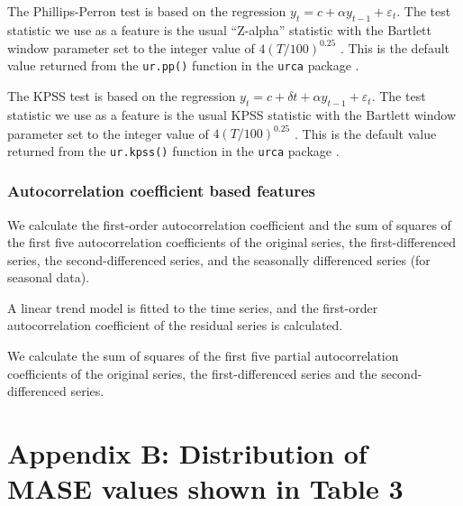 \documentclass[11pt,a4paper,]{article}
\begin{document}
The Phillips-Perron test is based on the regression \(y_t= c + \alpha y_{t-1}+ \varepsilon_t\). The test statistic we use as a feature is the usual ``Z-alpha'' statistic with the Bartlett window parameter set to the integer value of \(4(T/100)^{0.25}\) \autocite{Pfaff2008}. This is the default value returned from the \texttt{ur.pp()} function in the \texttt{urca} package \autocite{pfaff2016package}.

The KPSS test is based on the regression \(y_t=c+\delta t+\alpha y_{t-1}+\varepsilon_t\). The test statistic we use as a feature is the usual KPSS statistic with the Bartlett window parameter set to the integer value of \(4(T/100)^{0.25}\) \autocite{Pfaff2008}. This is the default value returned from the \texttt{ur.kpss()} function in the \texttt{urca} package \autocite{pfaff2016package}.

\hypertarget{autocorrelation-coefficient-based-features}{%
\subsubsection*{Autocorrelation coefficient based features}\label{autocorrelation-coefficient-based-features}}

We calculate the first-order autocorrelation coefficient and the sum of squares of the first five autocorrelation coefficients of the original series, the first-differenced series, the second-differenced series, and the seasonally differenced series (for seasonal data).

A linear trend model is fitted to the time series, and the first-order autocorrelation coefficient of the residual series is calculated.

We calculate the sum of squares of the first five partial autocorrelation coefficients of the original series, the first-differenced series and the second-differenced series.

\hypertarget{appendix-b-distribution-of-mase-values-shown-in-table-3}{%
\section*{Appendix B: Distribution of MASE values shown in Table 3}\label{appendix-b-distribution-of-mase-values-shown-in-table-3}}
\end{document}
